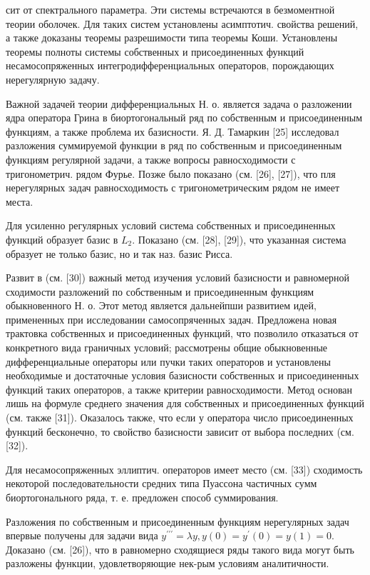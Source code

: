 \documentclass[10pt]{article}
\begin{document}
сит от спектрального параметра. Эти системы встречаются в безмоментной теории оболочек. Для таких систем установлены асимптотич. свойства решений, а также доказаны теоремы разрешимости типа теоремы Коши. Установлены теоремы полноты системы собственных и присоединенных функций несамосопряженных интегродифференциальных операторов, порождающих нерегулярную задачу.



Важной задачей теории дифференциальных Н. о. является задача о разложении ядра оператора Грина в биортогональный ряд по собственным и присоединенным функциям, а также проблема их базисности. Я. Д. Тамаркин [25] исследовал разложения суммируемой функции в ряд по собственным и присоединенным функциям регулярной задачи, а также вопросы равносходимости с тригонометрич. рядом Фурье. Позже было показано (см. [26], [27]), что пля нерегулярных задач равносходимость с тригонометрическим рядом не имеет места.



Для усиленно регулярных условий система собственных и присоединенных функций образует базис в $L_{2}$. Показано (см. [28], [29]), что указанная система образует не только базис, но и так наз. базис Рисса.



Развит в (см. [30]) важный метод изучения условий базисности и равномерной сходимости разложений по собственным и присоединенным функциям обыкновенного Н. о. Этот метод является дальнейпши развитием идей, примененных при исследовании самосопряченных задач. Предложена новая трактовка собственных и присоединенных функций, что позволило отказаться от конкретного вида граничных условий; рассмотрены общие обыкновенные дифференциальные операторы или пучки таких операторов и установлены необходимые и достаточные условия базисности собственных и присоединенных функций таких операторов, а также критерии равносходимости. Метод основан лишь на формуле среднего значения для собственных и присоединенных функций (см. также [31]). Оказалось также, что если у оператора число присоединенных функций бесконечно, то свойство базисности зависит от выбора последних (см. [32]).



Для несамосопряженных эллиптич. операторов имеет место (см. [33]) сходимость некоторой последовательности средних типа Пуассона частичных сумм биортогонального ряда, т. е. предложен способ суммирования.



Разложения по собственным и присоединенным функциям нерегулярных задач впервые получены для задачи вида $y^{\prime \prime \prime}=\lambda y, y(0)=y^{\prime}(0)=y(1)=0$. Доказано (см. [26]), что в равномерно сходящиеся ряды такого вида могут быть разложены функции, удовлетворяющие нек-рым условиям аналитичности.
\end{document}

